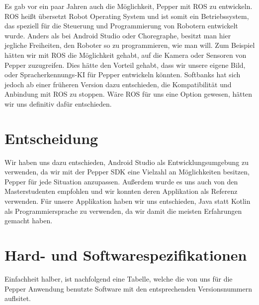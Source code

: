Es gab vor ein paar Jahren auch die Möglichkeit, Pepper mit ROS zu entwickeln. 
ROS heißt übersetzt \glqq Robot Operating System \glqq{} und ist somit ein Betriebssystem, das speziell für die Steuerung und Programmierung 
von Robotern entwickelt wurde. Anders als bei Android Studio oder Choregraphe, besitzt man hier jegliche Freiheiten, den Roboter so zu 
programmieren, wie man will. Zum Beispiel hätten wir mit ROS die Möglichkeit gehabt, auf die Kamera oder Sensoren von Pepper zuzugreifen. 
Dies hätte den Vorteil gehabt, dass wir unsere eigene Bild, oder Spracherkennungs-KI für Pepper entwickeln könnten. Softbanks hat sich 
jedoch ab einer früheren Version dazu entschieden, die Kompatibilität und Anbindung mit ROS zu stoppen. Wäre ROS für uns eine Option 
gewesen, hätten wir uns definitiv dafür entschieden. 

\section{Entscheidung}

Wir haben uns dazu entschieden, Android Studio als Entwicklungsumgebung zu verwenden, da wir mit der Pepper SDK eine Vielzahl an 
Möglichkeiten besitzen, Pepper für jede Situation anzupassen. Außerdem wurde es uns auch von den Masterstudenten empfohlen und wir konnten 
deren Applikation als Referenz verwenden. Für unsere Applikation haben wir uns entschieden, Java statt Kotlin als Programmiersprache zu 
verwenden, da wir damit die meisten Erfahrungen gemacht haben. 

\section{Hard- und Softwarespezifikationen}
Einfachheit halber, ist nachfolgend eine Tabelle, welche die von uns für die Pepper Anwendung benutzte Software mit den
entsprechenden Versionsnummern auflsitet.

